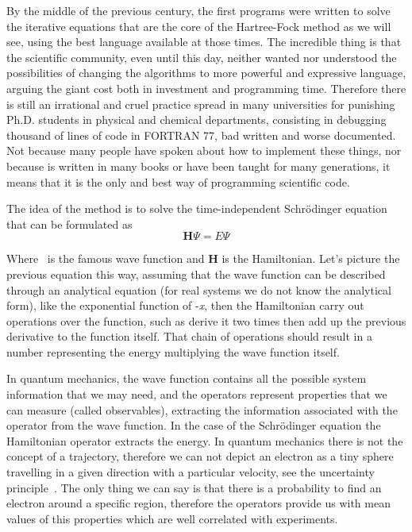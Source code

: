 \documentclass{tmr}
\begin{document}
\par By the middle of the previous century, the first programs were written to solve the 
iterative equations that are the core of the Hartree-Fock method as we will see, using
the best language available at those times. The incredible thing is that the scientific community, even until
this day, neither wanted nor understood the possibilities of changing the algorithms to 
more powerful and expressive language, arguing the giant cost both in investment and programming time. Therefore 
there is still an irrational and cruel practice spread in many universities for punishing Ph.D. students
in physical and chemical departments, consisting in debugging thousand of lines of code in FORTRAN 77,
bad written and worse documented. Not because many people have spoken about how to implement
these things, nor because is written in many books or have been taught 
for many generations, it means that it is the only and best way of programming scientific code.

\par The idea of the method is to solve the time-independent Schr\"{o}dinger
 equation that can be formulated as
\[ \mathbf{H}\Psi = E\Psi \]

Where \textPsi\ is the famous wave function and \textbf{H} is the Hamiltonian. 
Let's picture the previous equation this way, assuming that the wave function 
can be described through an analytical equation (for real systems we do not know the analytical form),
like the exponential function of -\textit{\textalpha x},
then the Hamiltonian carry out operations over the function, such as derive it two times 
then add up the previous derivative to the function itself.
That chain of operations should result in a number representing the energy
multiplying the wave function itself.
\par In quantum mechanics, the wave function contains all the possible system information that 
we may need, and the operators represent properties that we can measure (called observables),
extracting the information associated with the operator from the wave function.
In the case of the Schr\"odinger equation the Hamiltonian operator extracts the energy. 
In quantum mechanics there is not the concept of a trajectory, therefore we can not depict an electron
as a tiny sphere travelling in a given direction with a particular velocity,
see the uncertainty principle~\cite{uncertainty}. The only thing
we can say is that there is a probability to find an electron
around a specific region, therefore the operators provide us with mean values of this properties which are
well correlated with experiments. 
\end{document}
